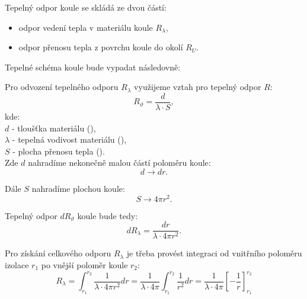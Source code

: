 \documentclass{article}
\begin{document}
Tepelný odpor koule se skládá ze dvou částí:
\begin{itemize}
    \item odpor vedení tepla v materiálu koule $R_\lambda$,
    \item odpor přenosu tepla z povrchu koule do okolí $R_U$.
\end{itemize}

Tepelné schéma koule bude vypadat následovně:

\begin{center}
\end{center}


Pro odvození tepelného odporu $R_{\lambda}$ využijeme vztah pro tepelný odpor $R$:
$$
    R_{\vartheta} = \frac{d}{\lambda \cdot S},
$$
kde:\\
$d$ - tloušťka materiálu (\ueqM),\\
$\lambda$ - tepelná vodivost materiálu (\ueqWandMinvKinv),\\
$S$ - plocha přenosu tepla (\ueqMsq).\\

Zde $d$ nahradíme nekonečně malou částí poloměru koule:
$$
    d \rightarrow dr.
$$

Dále $S$ nahradíme plochou koule:
$$
    S \rightarrow 4 \pi r^2.
$$

Tepelný odpor $dR_{\vartheta}$ koule bude tedy:
$$
    dR_\lambda = \frac{dr}{\lambda \cdot 4 \pi r^2}.
$$

Pro získání celkového odporu $R_{\lambda}$ je třeba provést integraci od vnitřního poloměru izolace $r_1$ po vnější poloměr koule $r_2$:
$$
    R_\lambda = \int_{r_1}^{r_2} \frac{1}{\lambda \cdot 4 \pi r^2} dr = \frac{1}{\lambda \cdot 4 \pi} \int_{r_1}^{r_2} \frac{1}{r^2} dr = \frac{1}{\lambda \cdot 4 \pi} \left[ -\frac{1}{r} \right]_{r_1}^{r_2}
$$
\end{document}
